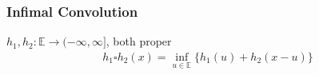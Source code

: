 \documentclass[11pt]{article}
\begin{document}
\subsubsection{Infimal Convolution}
\begin{definition}
    $h_1,h_2: \mathbb{E} \to (-\infty,\infty]$, both proper
    \begin{align*}
        h_1 \square h_2(x) = \inf_{u \in \mathbb{E}}\{ h_1(u)+h_2(x-u) \}
    \end{align*}
\end{definition}
    
\end{document}
